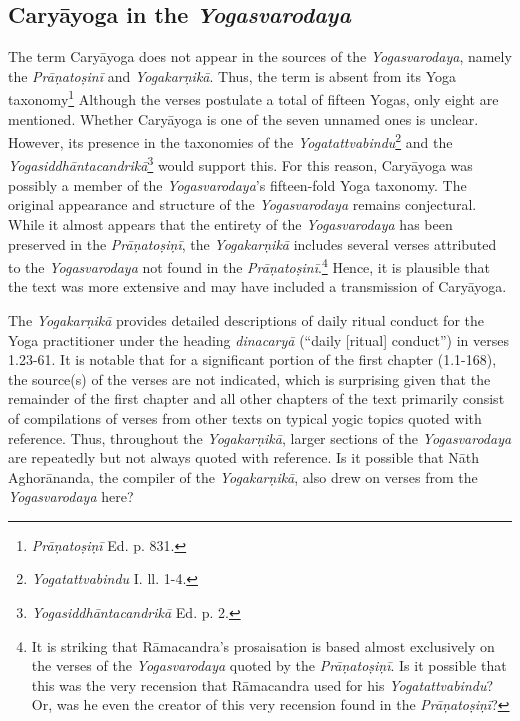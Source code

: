 \subsection{Caryāyoga in the \textit{Yogasvarodaya}}
\label{caryasvaro}
The term Caryāyoga does not appear in the sources of the \textit{Yogasvarodaya}, namely the \textit{Prāṇatoṣinī} and \textit{Yogakarṇikā}. Thus, the term is absent from its Yoga taxonomy\footnote{\textit{Prāṇatoṣiṇī} Ed. p. 831.} Although the verses postulate a total of fifteen Yogas, only eight are mentioned. Whether Caryāyoga is one of the seven unnamed ones is unclear. However, its presence in the taxonomies of the \textit{Yogatattvabindu}\footnote{\textit{Yogatattvabindu} I. ll. 1-4.} and the \textit{Yogasiddhāntacandrikā}\footnote{\textit{Yogasiddhāntacandrikā} Ed. p. 2.} would support this. For this reason, Caryāyoga was possibly a member of the \textit{Yogasvarodaya}'s fifteen-fold Yoga taxonomy. The original appearance and structure of the \textit{Yogasvarodaya} remains conjectural. While it almost appears that the entirety of the \textit{Yogasvarodaya} has been preserved in the \textit{Prāṇatoṣiṇī}, the \textit{Yogakarṇikā} includes several verses attributed to the \textit{Yogasvarodaya} not found in the \textit{Prāṇatoṣinī}.\footnote{It is striking that Rāmacandra's prosaisation is based almost exclusively on the verses of the \textit{Yogasvarodaya} quoted by the \textit{Prāṇatoṣiṇī}. Is it possible that this was the very recension that Rāmacandra used for his \emph{Yogatattvabindu}? Or, was he even the creator of this very recension found in the \textit{Prāṇatoṣiṇī}?} Hence, it is plausible that the text was more extensive and may have included a transmission of Caryāyoga.

The \textit{Yogakarṇikā} provides detailed descriptions of daily ritual conduct for the Yoga practitioner under the heading \textit{dinacaryā} (``daily [ritual] conduct'') in verses 1.23-61. It is notable that for a significant portion of the first chapter (1.1-168), the source(s) of the verses are not indicated, which is surprising given that the remainder of the first chapter and all other chapters of the text primarily consist of compilations of verses from other texts on typical yogic topics quoted with reference. Thus, throughout the \textit{Yogakarṇikā}, larger sections of the \textit{Yogasvarodaya} are repeatedly but not always quoted with reference. Is it possible that Nāth Aghorānanda, the compiler of the \textit{Yogakarṇikā}, also drew on verses from the \textit{Yogasvarodaya} here?

